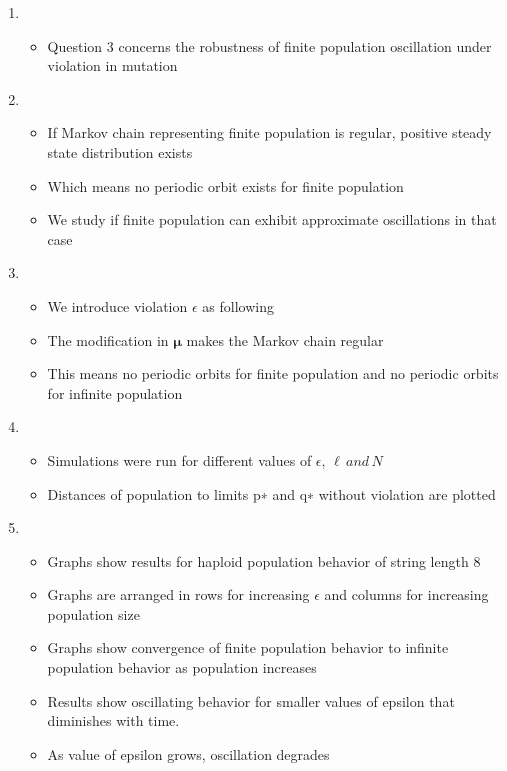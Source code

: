 \documentclass{article}
\begin{document}
\begin{enumerate}
\item
  \begin{itemize}
  \item Question 3 concerns the robustness of finite population oscillation under violation in mutation
  
  \end{itemize}

\item
  \begin{itemize}
  \item If Markov chain representing finite population is regular, positive steady state distribution exists 
  \item Which means no periodic orbit exists for finite population
  \item We study if finite population can exhibit approximate oscillations in that case  
  
  \end{itemize}
  
\item
  \begin{itemize}
  \item We introduce violation $\epsilon$ as following
  \item The modification in $\bm{\mu}$ makes the Markov chain regular
  \item This means no periodic orbits for finite population and no periodic orbits for infinite population
  
  \end{itemize}
  
\item
  \begin{itemize}
  \item Simulations were run for different values of $\epsilon,\, \ell \,and\, N$
  \item Distances of population to limits p∗ and q∗ without violation are plotted  
  \end{itemize}
  
\item
  \begin{itemize}
  \item Graphs show results for haploid population behavior of string length 8
  \item Graphs are arranged in rows for increasing $\epsilon$ and columns for increasing population size
  \item Graphs show convergence of finite population behavior to infinite population behavior as population increases
  \item Results show oscillating behavior for smaller values of epsilon that diminishes with time.
  \item As value of epsilon grows, oscillation degrades
  

\end{itemize}
\end{enumerate}
\end{document}
